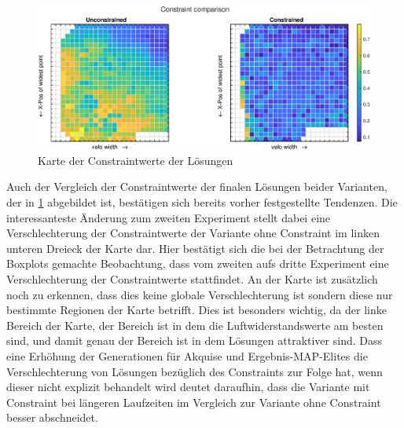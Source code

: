 \begin{figure}[h]
	\includegraphics[width=1\linewidth]{bilder/6pt1000Samples/constraintMapComparison}
	\caption{Karte der Constraintwerte der Lösungen}
	\label{fig:3rdmapCon}
\end{figure}

Auch der Vergleich der Constraintwerte der finalen Lösungen beider Varianten,  der in \cref{fig:3rdmapCon} abgebildet ist, bestätigen sich bereits vorher festgestellte Tendenzen.
Die interessanteste Änderung zum zweiten Experiment stellt dabei eine Verschlechterung der Constraintwerte der Variante ohne Constraint im linken unteren Dreieck der Karte dar.
Hier bestätigt sich die bei der Betrachtung der Boxplots gemachte Beobachtung, dass vom zweiten aufs dritte Experiment eine Verschlechterung der Constraintwerte stattfindet.
An der Karte ist zusätzlich noch zu erkennen, dass dies keine globale Verschlechterung ist sondern diese nur bestimmte Regionen der Karte betrifft.
Dies ist besonders wichtig, da der linke Bereich der Karte, der Bereich ist in dem die Luftwiderstandswerte am besten sind, und damit genau der Bereich ist in dem Lösungen attraktiver sind.
Dass eine Erhöhung der Generationen für Akquise und Ergebnis-MAP-Elites die Verschlechterung von Lösungen bezüglich des Constraints zur Folge hat, wenn dieser nicht explizit behandelt wird deutet daraufhin, dass die Variante mit Constraint bei längeren Laufzeiten im Vergleich zur Variante ohne Constraint besser abschneidet. 

